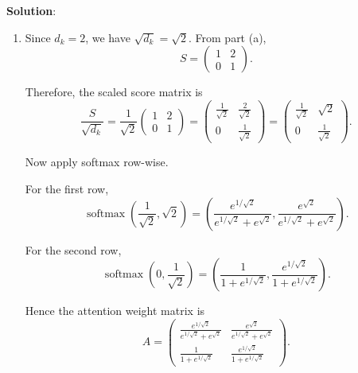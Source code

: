 \documentclass[submit]{harvardml}
\newenvironment{solution}{
    \vspace{2mm}
    \color{blue}\noindent\textbf{Solution}:
}{}
\begin{document}
\begin{solution}
\begin{enumerate}
\begin{enumerate}
Hence,
\[
Q=\begin{pmatrix}
1 & 1\\
0 & 1
\end{pmatrix},
\qquad
K=\begin{pmatrix}
1 & 0\\
1 & 1
\end{pmatrix},
\qquad
V=\begin{pmatrix}
2 & 0\\
0 & 1
\end{pmatrix},
\qquad
S=\begin{pmatrix}
1 & 2\\
0 & 1
\end{pmatrix}.
\]
\item Since \(d_k = 2\), we have \(\sqrt{d_k} = \sqrt{2}\). From part (a),
\[
S=\begin{pmatrix}
1 & 2\\
0 & 1
\end{pmatrix}.
\]

Therefore, the scaled score matrix is
\[
\frac{S}{\sqrt{d_k}}
=
\frac{1}{\sqrt{2}}
\begin{pmatrix}
1 & 2\\
0 & 1
\end{pmatrix}
=
\begin{pmatrix}
\frac{1}{\sqrt{2}} & \frac{2}{\sqrt{2}}\\[4pt]
0 & \frac{1}{\sqrt{2}}
\end{pmatrix}
=
\begin{pmatrix}
\frac{1}{\sqrt{2}} & \sqrt{2}\\[4pt]
0 & \frac{1}{\sqrt{2}}
\end{pmatrix}.
\]

Now apply softmax row-wise.

For the first row,
\[
\operatorname{softmax}\!\left(\frac{1}{\sqrt{2}}, \sqrt{2}\right)
=
\left(
\frac{e^{1/\sqrt{2}}}{e^{1/\sqrt{2}}+e^{\sqrt{2}}},
\frac{e^{\sqrt{2}}}{e^{1/\sqrt{2}}+e^{\sqrt{2}}}
\right).
\]

For the second row,
\[
\operatorname{softmax}\!\left(0,\frac{1}{\sqrt{2}}\right)
=
\left(
\frac{1}{1+e^{1/\sqrt{2}}},
\frac{e^{1/\sqrt{2}}}{1+e^{1/\sqrt{2}}}
\right).
\]

Hence the attention weight matrix is
\[
A=
\begin{pmatrix}
\frac{e^{1/\sqrt{2}}}{e^{1/\sqrt{2}}+e^{\sqrt{2}}}
&
\frac{e^{\sqrt{2}}}{e^{1/\sqrt{2}}+e^{\sqrt{2}}}
\\[10pt]
\frac{1}{1+e^{1/\sqrt{2}}}
&
\frac{e^{1/\sqrt{2}}}{1+e^{1/\sqrt{2}}}
\end{pmatrix}.
\]


\end{enumerate}
\end{enumerate}
\end{solution}
\end{document}

